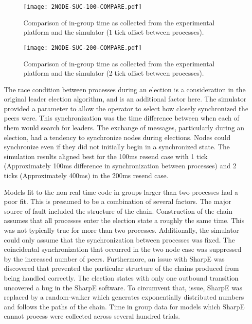 \begin{figure}
\centering
\begin{minipage}{0.45\textwidth}
    \centering
    \texttt{[image: 2NODE-SUC-100-COMPARE.pdf]}
    \caption{Comparison of in-group time as collected from the experimental platform and the simulator (1 tick offset between processes).}
    \label{fig:COMPARE-SUC-2NODE-100}
\end{minipage}%
\qquad
\begin{minipage}{0.45\textwidth}
    \centering
    \texttt{[image: 2NODE-SUC-200-COMPARE.pdf]}
    \caption{Comparison of in-group time as collected from the experimental platform and the simulator (2 tick offset between processes).}
    \label{fig:COMPARE-SUC-2NODE-200}
\end{minipage}
\end{figure}

The race condition between processes during an election is a consideration in the original leader election algorithm, and is an additional factor here.
The simulator provided a parameter to allow the operator to select how closely synchronized the peers were.
This synchronization was the time difference between when each of them would search for leaders.
The exchange of messages, particularly during an election, had a tendency to synchronize nodes during elections.
Nodes could synchronize even if they did not initially begin in a synchronized state. 
The simulation results aligned best for the 100ms resend case with 1 tick (Approximately 100ms difference in synchronization between processes) and 2 ticks (Approximately 400ms) in the 200ms resend case.

Models fit to the non-real-time code in groups larger than two processes had a poor fit.
This is presumed to be a combination of several factors.
The major source of fault included the structure of the chain. 
Construction of the chain assumes that all processes enter the election state a roughly the same time. 
This was not typically true for more than two processes.
Additionally, the simulator could only assume that the synchronization between processes was fixed.
The coincidental synchronization that occurred in the two node case was suppressed by the increased number of peers.
Furthermore, an issue with SharpE was discovered that prevented the particular structure of the chains produced from being handled correctly.
The election states with only one outbound transition uncovered a bug in the SharpE software.
To circumvent that, issue, SharpE was replaced by a random-walker which generates exponentially distributed numbers and follows the paths of the chain.
Time in group data for models which SharpE cannot process were collected across several hundred trials.

